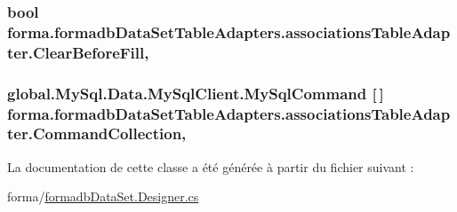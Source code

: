 \subsubsection[{\texorpdfstring{Clear\+Before\+Fill}{ClearBeforeFill}}]{\setlength{\rightskip}{0pt plus 5cm}bool forma.\+formadb\+Data\+Set\+Table\+Adapters.\+associations\+Table\+Adapter.\+Clear\+Before\+Fill\hspace{0.3cm}{\ttfamily [get]}, {\ttfamily [set]}}\hypertarget{classforma_1_1formadb_data_set_table_adapters_1_1associations_table_adapter_acdb2f5d6cc8b8883e71627868d5824cf}{}\label{classforma_1_1formadb_data_set_table_adapters_1_1associations_table_adapter_acdb2f5d6cc8b8883e71627868d5824cf}
\subsubsection[{\texorpdfstring{Command\+Collection}{CommandCollection}}]{\setlength{\rightskip}{0pt plus 5cm}global.\+My\+Sql.\+Data.\+My\+Sql\+Client.\+My\+Sql\+Command \mbox{[}$\,$\mbox{]} forma.\+formadb\+Data\+Set\+Table\+Adapters.\+associations\+Table\+Adapter.\+Command\+Collection\hspace{0.3cm}{\ttfamily [get]}, {\ttfamily [protected]}}\hypertarget{classforma_1_1formadb_data_set_table_adapters_1_1associations_table_adapter_a7957aa86205ecaaf53ac11d0257e5d3a}{}\label{classforma_1_1formadb_data_set_table_adapters_1_1associations_table_adapter_a7957aa86205ecaaf53ac11d0257e5d3a}


La documentation de cette classe a été générée à partir du fichier suivant \+:\begin{DoxyCompactItemize}
\item 
forma/\hyperlink{formadb_data_set_8_designer_8cs}{formadb\+Data\+Set.\+Designer.\+cs}\end{DoxyCompactItemize}
